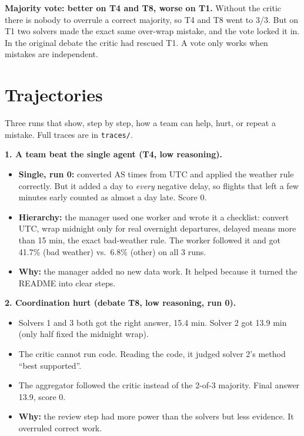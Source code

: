 \documentclass[10pt]{article}
\begin{document}
\textbf{Majority vote: better on T4 and T8, worse on T1.} Without the critic there is nobody to overrule a correct
majority, so T4 and T8 went to 3/3. But on T1 two solvers made the exact same over-wrap mistake, and the vote locked
it in. In the original debate the critic had rescued T1. A vote only works when mistakes are independent.

\section{Trajectories}

Three runs that show, step by step, how a team can help, hurt, or repeat a mistake. Full traces are in \texttt{traces/}.

\textbf{1. A team beat the single agent (T4, low reasoning).}
\begin{itemize}
\item \textbf{Single, run 0:} converted AS times from UTC and applied the weather rule correctly. But it added a day
  to \emph{every} negative delay, so flights that left a few minutes early counted as almost a day late. Score 0.
\item \textbf{Hierarchy:} the manager used one worker and wrote it a checklist: convert UTC, wrap midnight only for
  real overnight departures, delayed means more than 15 min, the exact bad-weather rule. The worker followed it and
  got 41.7\% (bad weather) vs.\ 6.8\% (other) on all 3 runs.
\item \textbf{Why:} the manager added no new data work. It helped because it turned the README into clear steps.
\end{itemize}

\textbf{2. Coordination hurt (debate T8, low reasoning, run 0).}
\begin{itemize}
\item Solvers 1 and 3 both got the right answer, 15.4 min. Solver 2 got 13.9 min (only half fixed the midnight wrap).
\item The critic cannot run code. Reading the code, it judged solver 2's method ``best supported''.
\item The aggregator followed the critic instead of the 2-of-3 majority. Final answer 13.9, score 0.
\item \textbf{Why:} the review step had more power than the solvers but less evidence. It overruled correct work.
\end{itemize}
\end{document}
